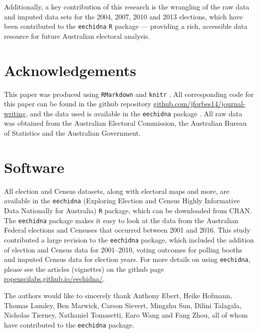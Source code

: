 \documentclass[11pt,a4paper,]{article}
\begin{document}
Additionally, a key contribution of this research is the wrangling of
the raw data and imputed data sets for the 2004, 2007, 2010 and 2013
elections, which have been contributed to the \texttt{eechidna}
\texttt{R} package --- providing a rich, accessible data resource for
future Australian electoral analysis.

\section{Acknowledgements}\label{acknowledgements}

This paper was produced using \texttt{RMarkdown} \autocite{rmarkdown}
and \texttt{knitr} \autocite{knitr}. All corresponding code for this
paper can be found in the github repository
\href{https://github.com/jforbes14/journal-writing}{github.com/jforbes14/journal-writing},
and the data used is available in the \texttt{eechidna} package
\autocite{eechidna}. All raw data was obtained from the Australian
Electoral Commission, the Australian Bureau of Statistics and the
Australian Government.

\section{Software}\label{software}

All election and Census datasets, along with electoral maps and more,
are available in the \texttt{eechidna} (Exploring Election and Census
Highly Informative Data Nationally for Australia) \texttt{R} package,
which can be downloaded from CRAN. The \texttt{eechidna} package makes
it easy to look at the data from the Australian Federal elections and
Censuses that occurred between 2001 and 2016. This study contributed a
large revision to the \texttt{eechidna} package, which included the
addition of election and Census data for 2001--2010, voting outcomes for
polling booths and imputed Census data for election years. For more
details on using \texttt{eechidna}, please see the articles (vignettes)
on the github page
\href{https://ropenscilabs.github.io/eechidna/}{ropenscilabs.github.io/eechidna/}.

The authors would like to sincerely thank Anthony Ebert, Heike Hofmann,
Thomas Lumley, Ben Marwick, Carson Sievert, Mingzhu Sun, Dilini
Talagala, Nicholas Tierney, Nathaniel Tomasetti, Earo Wang and Fang
Zhou, all of whom have contributed to the \texttt{eechidna} package.

\printbibliography
\end{document}
